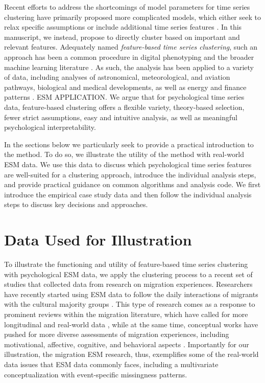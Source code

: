 \documentclass[man, 12pt, a4paper, mask, floatsintext]{apa7}
\theoremstyle{break}
\theoremstyle{plain}
\begin{document}
Recent efforts to address the shortcomings of model parameters for time series clustering have primarily proposed more complicated models, which either seek to relax specific assumptions \citep[e.g.,][]{denteuling2021} or include additional time series features \citep[e.g., see][]{krone2018}. In this manuscript, we instead, propose to directly cluster based on important and relevant features. Adequately named \textit{feature-based time series clustering}, such an approach has been a common procedure in digital phenotyping \citep[][]{loftus2022} and the broader machine learning literature \citep[][]{maharaj2019}. As such, the analysis has been applied to a variety of data, including analyses of astronomical, meteorological, and aviation pathways, biological and medical developments, as well as energy and finance patterns \citep{Aghabozorgi2015}. ESM APPLICATION. We argue that for psychological time series data, feature-based clustering offers a flexible variety, theory-based selection, fewer strict assumptions, easy and intuitive analysis, as well as meaningful psychological interpretability. 

In the sections below we particularly seek to provide a practical introduction to the method. To do so, we illustrate the utility of the method with real-world ESM data. We use this data to discuss which psychological time series features are well-suited for a clustering approach, introduce the individual analysis steps, and provide practical guidance on common algorithms and analysis code. We first introduce the empirical case study data and then follow the individual analysis steps to discuss key decisions and approaches.

\section{Data Used for Illustration}

To illustrate the functioning and utility of feature-based time series clustering with psychological ESM data, we apply the clustering process to a recent set of studies that collected data from research on migration experiences. Researchers have recently started using ESM data to follow the daily interactions of migrants with the cultural majority groups \citep[e.g.,][]{Keil2020}. This type of research comes as a response to prominent reviews within the migration literature, which have called for more longitudinal \citep[e.g.,][]{Ward2019} and real-world data \citep[e.g.,][]{McKeown2017}, while at the same time, conceptual works have pushed for more diverse assessments of migration experiences, including motivational, affective, cognitive, and behavioral aspects \citep[e.g.,][]{Kreienkamp2022d}. Importantly for our illustration, the migration ESM research, thus, exemplifies some of the real-world data issues that ESM data commonly faces, including a multivariate conceptualization with event-specific missingness patterns.
\end{document}
